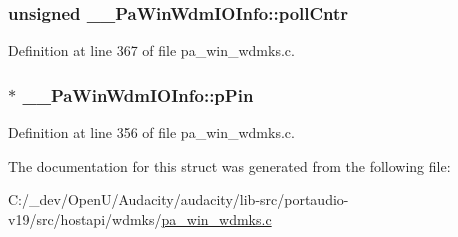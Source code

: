 \subsubsection[{\texorpdfstring{poll\+Cntr}{pollCntr}}]{\setlength{\rightskip}{0pt plus 5cm}unsigned \+\_\+\+\_\+\+Pa\+Win\+Wdm\+I\+O\+Info\+::poll\+Cntr}\hypertarget{struct_____pa_win_wdm_i_o_info_a759db1d44a817fa5b51e8a81fe80d038}{}\label{struct_____pa_win_wdm_i_o_info_a759db1d44a817fa5b51e8a81fe80d038}


Definition at line 367 of file pa\+\_\+win\+\_\+wdmks.\+c.

\subsubsection[{\texorpdfstring{p\+Pin}{pPin}}]{$\ast$ \+\_\+\+\_\+\+Pa\+Win\+Wdm\+I\+O\+Info\+::p\+Pin}\hypertarget{struct_____pa_win_wdm_i_o_info_a84417e7854458897d856bb65f6161299}{}\label{struct_____pa_win_wdm_i_o_info_a84417e7854458897d856bb65f6161299}


Definition at line 356 of file pa\+\_\+win\+\_\+wdmks.\+c.



The documentation for this struct was generated from the following file\+:\begin{DoxyCompactItemize}
\item 
C\+:/\+\_\+dev/\+Open\+U/\+Audacity/audacity/lib-\/src/portaudio-\/v19/src/hostapi/wdmks/\hyperlink{pa__win__wdmks_8c}{pa\+\_\+win\+\_\+wdmks.\+c}\end{DoxyCompactItemize}
